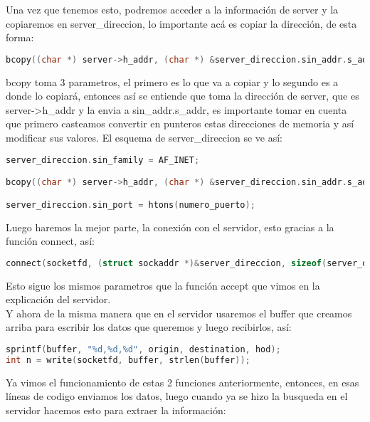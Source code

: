 \documentclass{article}
\begin{document}
Una vez que tenemos esto, podremos acceder a la información de server y la copiaremos en server\_direccion, lo importante acá es copiar la dirección, de esta forma:

\begin{lstlisting}[language=C]
bcopy((char *) server->h_addr, (char *) &server_direccion.sin_addr.s_addr, server->h_length);
\end{lstlisting}

bcopy toma 3 parametros, el primero es lo que va a copiar y lo segundo es a donde lo copiará, entonces así se entiende que toma la dirección de server, que es server->h\_addr y la envia a sin\_addr.s\_addr, es importante tomar en cuenta que primero casteamos convertir en punteros estas direcciones de memoria y así modificar sus valores.
El esquema de server\_direccion se ve así:

\begin{lstlisting}[language=C]
server_direccion.sin_family = AF_INET;

bcopy((char *) server->h_addr, (char *) &server_direccion.sin_addr.s_addr, server->h_length);

server_direccion.sin_port = htons(numero_puerto);

\end{lstlisting}

Luego haremos la mejor parte, la conexión con el servidor, esto gracias a la función connect, así:


\begin{lstlisting}[language=C]
connect(socketfd, (struct sockaddr *)&server_direccion, sizeof(server_direccion)
\end{lstlisting}

Esto sigue los mismos parametros que la función accept que vimos en la explicación del servidor.\\ 
Y ahora de la misma manera que en el servidor usaremos el buffer que creamos arriba para escribir los datos que queremos y luego recibirlos, así:

\begin{lstlisting}[language=C]
sprintf(buffer, "%d,%d,%d", origin, destination, hod);
int n = write(socketfd, buffer, strlen(buffer));
\end{lstlisting}

Ya vimos el funcionamiento de estas 2 funciones anteriormente, entonces, en esas líneas de codigo enviamos los datos, luego cuando ya se hizo la busqueda en el servidor hacemos esto para extraer la información:
\end{document}
